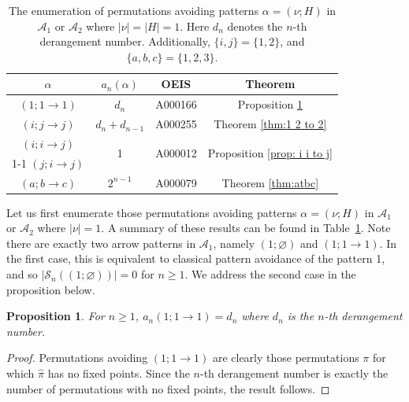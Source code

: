 \documentclass[11pt]{article}
\renewcommand\S{\mathcal S}
\newcommand\A{\mathcal A}
\newtheorem{proposition}[theorem]{Proposition}
\theoremstyle{definition}
\begin{document}
\renewcommand{\arraystretch}{1.2}
\begin{table}[H]
    \centering
    \begin{tabular}{|c|c|c|c|} 
    \hline
         $\alpha$  & $a_n(\alpha)$  & OEIS & Theorem \\ \hline\hline
          $(1;1\to1)$ 
        & $d_n$&  A000166 &Proposition \ref{prop: 1 1 to 1} \\ \hline
            $(i;j\to j)$ 
        & $d_n+d_{n-1}$& {A000255}  &Theorem \ref{thm:1 2 to 2} \\  \hline
         $(i;i\to j)$ & \multirow{2}{*}{1} &\multirow{2}{*}{A000012} &\multirow{2}{*}{Proposition \ref{prop: i i to j}}  \\  \cline{1-1}
          $(j;i\to j)$ & & &   \\ \hline
          $(a;b\to c)$ 
        & $2^{n-1}$& A000079 &Theorem \ref{thm:atbc} \\ \hline
        
    \end{tabular}
    \caption{The enumeration of permutations avoiding patterns $\alpha=(\nu;H)$ in $\A_1$ or $\A_2$ where $|\nu|=|H|=1$.  Here $d_n$ denotes the $n$-th derangement number. Additionally, $\{i,j\}=\{1,2\}$, and $\{a,b,c\}=\{1,2,3\}.$}
    \label{tab: A1 and A2}
\end{table}

Let us first enumerate those permutations avoiding patterns $\alpha=(\nu;H)$ in $\A_1$ or $\A_2$ where $|\nu|=1$.  A summary of these results can be found in Table~\ref{tab: A1 and A2}.
Note there are exactly two arrow patterns in $\A_1$, namely $(1; \varnothing)$ and $(1;1\to1)$. In the first case, this is equivalent to classical pattern avoidance of the pattern 1, and so $|\S_n((1;\varnothing))|=0$ for $n\geq 1$. We address the second case in the proposition below.

\begin{proposition}\label{prop: 1 1 to 1}
    For $n \geq 1$, $a_n(1;1 \to 1) = d_n$ where $d_n$ is the $n$-th derangement number.
\end{proposition}

\begin{proof}
    Permutations avoiding $(1;1\to1)$ are clearly those permutations $\pi$ for which $\hat\pi$ has no fixed points. Since the $n$-th derangement number is exactly the number of permutations with no fixed points, the result follows.
\end{proof}
\end{document}
